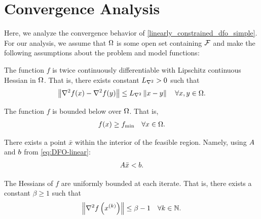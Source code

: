 \section{Convergence Analysis}
\label{linear_convergence_discussion}
 
Here, we analyze the convergence behavior of \cref{linearly_constrained_dfo_simple}.
For our analysis, we assume that $\Omega$ is some open set containing ${\mathcal F}$ and make the following assumptions about the problem and model functions:

\begin{assumption}
\label{for_fully_quadratic}
\label{lipschitz_hessian}
The function $f$ is twice continuously differentiable with Lipschitz continuous Hessian in $\Omega$.   That is, there exists constant ${L_{\nabla^2}} > 0$ such that 
\begin{align}
\left\|\nabla^2 f(x) - \nabla^2 f(y)\right\| \le {L_{\nabla^2}} \left\|x - y\right\| \quad \forall x, y \in \Omega.
\end{align}
\end{assumption}




\begin{assumption}
\label{lower_bound}
The function $f$ is bounded below over $\Omega$.
That is,
\begin{align}
f(x) \ge f_{\text{min}} \quad \forall x \in \Omega.
\end{align}
\end{assumption}

\begin{assumption}
\label{interior_point}
There exists a point $\bar x$ within the interior of the feasible region.
Namely, using ${A}$ and ${b}$ from \cref{eq:DFO-linear}:
\begin{align}
{A} \bar x < {b}.
\end{align}
\end{assumption}


\begin{assumption}
\label{uniformly_bounded_hessians_of_f}
The Hessians of $f$ are uniformly bounded at each iterate. That is, there exists a constant $\beta \ge 1$ such that
\begin{align*}
\left\|\nabla^2 f\left(x^{(k)}\right)\right\| \le \beta - 1\quad \forall k \in \mathbb N.
\end{align*}
\end{assumption}


